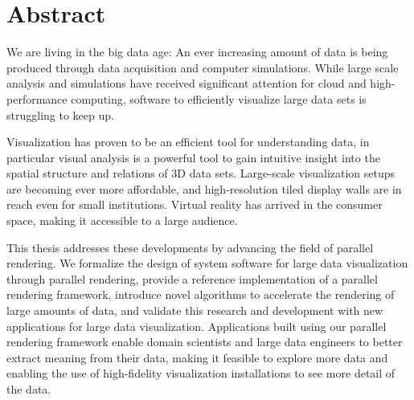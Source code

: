 
\chapter*{Abstract} 

We are living in the big data age: An ever increasing amount of data is being
produced through data acquisition and computer simulations. While large scale
analysis and simulations have received significant attention for cloud and
high-performance computing, software to efficiently visualize large data sets
is struggling to keep up.

Visualization has proven to be an efficient tool for understanding data, in
particular visual analysis is a powerful tool to gain intuitive insight into
the spatial structure and relations of 3D data sets. Large-scale visualization
setups are becoming ever more affordable, and high-resolution tiled display
walls are in reach even for small institutions. Virtual reality has arrived in
the consumer space, making it accessible to a large audience.

This thesis addresses these developments by advancing the field of parallel
rendering. We formalize the design of system software for large data
visualization through parallel rendering, provide a reference implementation of
a parallel rendering framework, introduce novel algorithms to accelerate the
rendering of large amounts of data, and validate this research and development
with new applications for large data visualization. Applications built using
our parallel rendering framework enable domain scientists and large data
engineers to better extract meaning from their data, making it feasible to
explore more data and enabling the use of high-fidelity visualization
installations to see more detail of the data.

